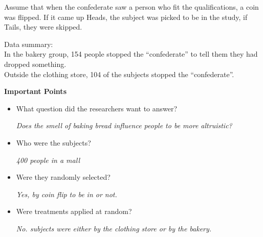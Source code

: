 Assume that when the confederate saw a person who fit the qualifications, a
coin was flipped. If it came up Heads, the subject was picked to be in
the study, if Tails, they were skipped.

Data summary:\\
 In the bakery group, 154 people stopped the ``confederate'' to tell
 them they had dropped something.\\
 Outside the clothing store, 104 of the subjects stopped the
 ``confederate''.  
\begin{center}
  {\large\bf Important Points}
\end{center}


\begin{itemize}
\item  What question did the researchers want to answer?
\begin{students}
 \vspace{.8cm}
\end{students}

\begin{key}
{\it Does the smell of baking bread influence people to be more altruistic?}
\end{key}


\item Who were the subjects?
\begin{students}
 \vspace{.8cm}
\end{students}

\begin{key}
{\it 400 people in a mall}
\end{key}


\item Were they randomly selected?
\begin{students}
 \vspace{.8cm}
\end{students}

\begin{key}
{\it Yes, by coin flip to be in or not.}
\end{key}



\item Were treatments applied at random?
\begin{students}
 \vspace{.8cm}
\end{students}

\begin{key}
 {\it No. subjects were either by the clothing store or by the bakery.}
\end{key}


\end{itemize}
